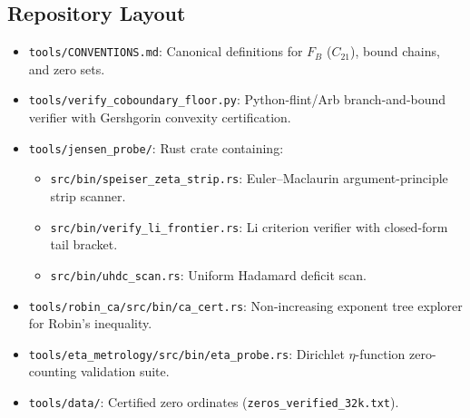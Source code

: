 \documentclass[11pt,a4paper]{article}
\theoremstyle{remark}
\begin{document}
\subsection{Repository Layout}
\begin{itemize}
\item \texttt{tools/CONVENTIONS.md}: Canonical definitions for $F_B$ ($C_{21}$), bound chains, and zero sets.
\item \texttt{tools/verify\_coboundary\_floor.py}: Python-flint/Arb branch-and-bound verifier with Gershgorin convexity certification.
\item \texttt{tools/jensen\_probe/}: Rust crate containing:
  \begin{itemize}
  \item \texttt{src/bin/speiser\_zeta\_strip.rs}: Euler--Maclaurin argument-principle strip scanner.
  \item \texttt{src/bin/verify\_li\_frontier.rs}: Li criterion verifier with closed-form tail bracket.
  \item \texttt{src/bin/uhdc\_scan.rs}: Uniform Hadamard deficit scan.
  \end{itemize}
\item \texttt{tools/robin\_ca/src/bin/ca\_cert.rs}: Non-increasing exponent tree explorer for Robin's inequality.
\item \texttt{tools/eta\_metrology/src/bin/eta\_probe.rs}: Dirichlet $\eta$-function zero-counting validation suite.
\item \texttt{tools/data/}: Certified zero ordinates (\texttt{zeros\_verified\_32k.txt}).
\end{itemize}
\end{document}
